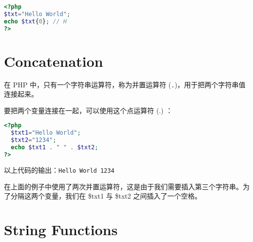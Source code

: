 \begin{lstlisting}[language=PHP]
<?php
$txt="Hello World";
echo $txt{0}; // H
?>
\end{lstlisting}


\section{Concatenation}



在 PHP 中，只有一个字符串运算符，称为并置运算符 (\texttt{.})，用于把两个字符串值连接起来。

要把两个变量连接在一起，可以使用这个点运算符 (.) ：

\begin{lstlisting}[language=PHP]
<?php
  $txt1="Hello World";
  $txt2="1234";
  echo $txt1 . " " . $txt2;
?>
\end{lstlisting}


以上代码的输出：\verb|Hello World 1234|


在上面的例子中使用了两次并置运算符，这是由于我们需要插入第三个字符串。为了分隔这两个变量，我们在 \$txt1 与 \$txt2 之间插入了一个空格。








\section{String Functions}



